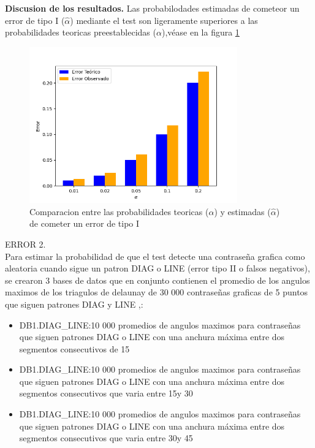\documentclass[12pt]{report}
\begin{document}
\textbf{Discusion de los resultados.}
Las probabilodades estimadas de cometeor un error de tipo I ($\hat{\alpha}$) mediante el test son ligeramente superiores  a las probabilidades teoricas preestablecidas ($\alpha$),véase en la figura \ref{Teorico vs Observado}
	\begin{figure}[ht]
	\centering
	
	\includegraphics[width=0.8\textwidth]{3td_teo_obs.png}
	\caption{Comparacion entre las probabilidades teoricas ($\alpha$) y estimadas ($\hat{\alpha}$) de cometer un error de tipo I }
	\label{Teorico vs Observado}
\end{figure}



ERROR 2.\\
Para estimar la probabilidad de que el test detecte una contraseña grafica como aleatoria cuando sigue un patron DIAG o LINE (error tipo II o falsos negativos), se crearon 3 bases de datos que en conjunto contienen el promedio de los angulos maximos de los triagulos de delaunay de  30 000 contraseñas graficas de 5 puntos que siguen patrones DIAG y LINE ,:
\begin{itemize}
	\item DB1.DIAG\_LINE:10 000 promedios de angulos maximos para contraseñas que siguen patrones DIAG o LINE con una anchura máxima entre dos segmentos consecutivos de 15\degree 
	\item DB1.DIAG\_LINE:10 000 promedios de angulos maximos para contraseñas que siguen patrones DIAG o LINE con una anchura máxima entre dos segmentos consecutivos que varia entre 15\degree y 30\degree 
	\item DB1.DIAG\_LINE:10 000 promedios de angulos maximos para contraseñas que siguen patrones DIAG o LINE con una anchura máxima entre dos segmentos consecutivos que varia entre 30\degree y 45\degree 
\end{itemize}
\end{document}
